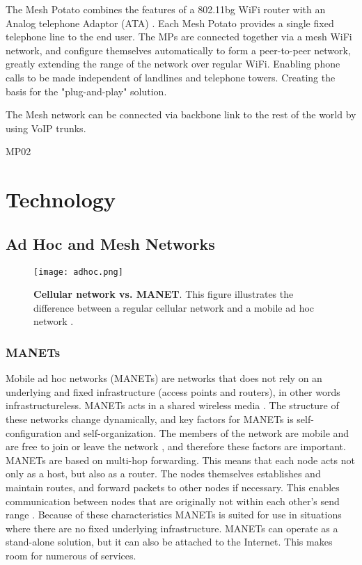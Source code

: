 The Mesh Potato combines the features of a 802.11bg WiFi router with an Analog telephone Adaptor (ATA) \cite{MP}. Each Mesh Potato provides a single fixed telephone line to the end user. The MPs are connected together via a mesh WiFi network, and  configure themselves automatically to form a peer-to-peer network, greatly extending the range of the network over regular WiFi. Enabling phone calls to be made independent of landlines and telephone towers. Creating the basis for the "plug-and-play" solution. 








The Mesh network can be connected via backbone link to the rest of the world by using VoIP trunks. 


MP02





\section{Technology}

\subsection{Ad Hoc and Mesh Networks}

\begin{figure}[h!]
  \centering
    \texttt{[image: adhoc.png]}
     \caption [Cellular network vs. MANET]{\textbf{Cellular network vs. MANET}. This figure illustrates the difference between a regular cellular network and a mobile ad hoc network \cite{adhoc2}.}
\label{fig:adhoc}
\end{figure}

\subsubsection{MANETs} Mobile ad hoc networks (MANETs) are networks that does not rely on an underlying and fixed infrastructure (access points and routers), in other words infrastructureless. MANETs acts in a shared wireless media \cite{adhoc}. The structure of these networks change dynamically, and key factors for MANETs is self-configuration and self-organization. The members of the network are mobile and are free to join or leave the network \cite{adhoc2}, and therefore these factors are important. MANETs are based on multi-hop forwarding. This means that each node acts not only as a host, but also as a router. The nodes themselves establishes and maintain routes, and forward packets to other nodes if necessary. This enables communication between nodes that are originally not within each other's send range \cite{adhoc2}. Because of these characteristics MANETs is suited for use in situations where there are no fixed underlying infrastructure. MANETs can operate as a stand-alone solution, but it can also be attached to the Internet. This makes room for numerous of services. 

